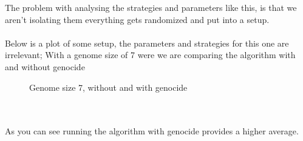 The problem with analysing the strategies and parameters like this, is that we aren't isolating them everything gets randomized and put into a setup.
\\\\
Below is a plot of some setup, the parameters and strategies for this one are irrelevant; With a genome size of 7 were we are comparing the algorithm with and without genocide
\begin{figure}[ht]
\centering
{}
    \caption{Genome size 7, without and with genocide}
\end{figure}
\\\\
As you can see running the algorithm with genocide provides a higher average.